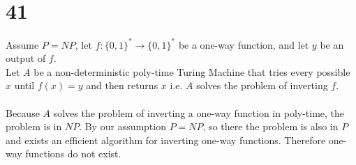 \documentclass[letterpaper,notitlepage,twoside]{article}
\begin{document}
\section*{41}
Assume $P=NP$, let $f:\{0,1\}^{*} \rightarrow \{0,1\}^{*}$ be a one-way function, and let $y$ be an output of $f$. \\
Let $A$ be a non-deterministic poly-time Turing Machine that tries every possible $x$ until $f(x) = y$ and then returns $x$ i.e. $A$ solves the problem of inverting $f$. \\ \\
Because $A$ solves the problem of inverting a one-way function in poly-time, the problem is in $NP$.
By our assumption $P=NP$, so there the problem is also in $P$ and exists an efficient algorithm for inverting one-way functions.
Therefore one-way functions do not exist.
\end{document}

